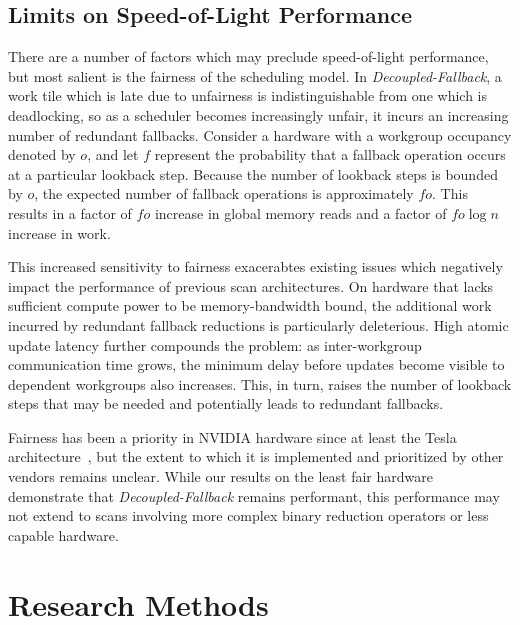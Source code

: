 \documentclass[sigconf]{acmart}
\begin{document}
\subsection{Limits on Speed-of-Light Performance}
There are a number of factors which may preclude speed-of-light performance, but most salient is the fairness of the scheduling model. In \emph{Decoupled-Fallback}, a work tile which is late due to unfairness is indistinguishable from one which is deadlocking, so as a scheduler becomes increasingly unfair, it incurs an increasing number of redundant fallbacks. Consider a hardware with a workgroup occupancy denoted by $o$, and let $f$ represent the probability that a fallback operation occurs at a particular lookback step. Because the number of lookback steps is bounded by $o$, the expected number of fallback operations is approximately $fo$. This results in a factor of $fo$ increase in global memory reads and a factor of $fo\log{n}$ increase in work.

This increased sensitivity to fairness exacerabtes existing issues which negatively impact the performance of previous scan architectures. On hardware that lacks sufficient compute power to be memory-bandwidth bound, the additional work incurred by redundant fallback reductions is particularly deleterious. High atomic update latency further compounds the problem: as inter-workgroup communication time grows, the minimum delay before updates become visible to dependent workgroups also increases. This, in turn, raises the number of lookback steps that may be needed and potentially leads to redundant fallbacks.

Fairness has been a priority in NVIDIA hardware since at least the Tesla architecture~\cite{}, but the extent to which it is implemented and prioritized by other vendors remains unclear. While our results on the least fair hardware demonstrate that \emph{Decoupled-Fallback} remains performant, this performance may not extend to scans involving more complex binary reduction operators or less capable hardware.
\begin{acks}
\end{acks}




\appendix

\section{Research Methods}
\end{document}
